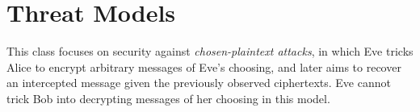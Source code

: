 \section{Threat Models}
This class focuses on security against \emph{chosen-plaintext attacks}, in which Eve tricks Alice to encrypt arbitrary messages of Eve's choosing, and later aims to recover an intercepted message given the previously observed ciphertexts. Eve cannot trick Bob into decrypting messages of her choosing in this model.